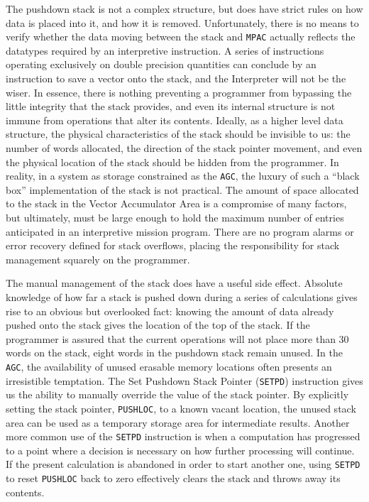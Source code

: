 \documentclass[refcap, oxford]{ahsan}
\begin{document}
The pushdown stack is not a complex structure, but does have strict rules on how data is placed into it, and how it is removed. Unfortunately, there is no means to verify whether the data moving between the stack and \texttt{MPAC} actually reflects the datatypes required by an interpretive instruction. A series of instructions operating exclusively on double precision quantities can conclude by an instruction to save a vector onto the stack, and the Interpreter will not be the wiser. In essence, there is nothing preventing a programmer from bypassing the little integrity that the stack provides, and even its internal structure is not immune from operations that alter its contents. Ideally, as a higher level data structure, the physical characteristics of the stack should be invisible to us: the number of words allocated, the direction of the stack pointer movement, and even the physical location of the stack should be hidden from the programmer. In reality, in a system as storage constrained as the \texttt{AGC}, the luxury of such a ``black box'' implementation of the stack is not practical. The amount of space allocated to the stack in the Vector Accumulator Area is a compromise of many factors, but ultimately, must be large enough to hold the maximum number of entries anticipated in an interpretive mission program. There are no program alarms or error recovery defined for stack overflows, placing the responsibility for stack management squarely on the programmer.

The manual management of the stack does have a useful side effect. Absolute knowledge of how far a stack is pushed down during a series of calculations gives rise to an obvious but overlooked fact: knowing the amount of data already pushed onto the stack gives the location of the top of the stack. If the programmer is assured that the current operations will not place more than 30 words on the stack, eight words in the pushdown stack remain unused. In the \texttt{AGC}, the availability of unused erasable memory locations often presents an irresistible temptation. The Set Pushdown Stack Pointer (\texttt{SETPD}) instruction gives us the ability to manually override the value of the stack pointer. By explicitly setting the stack pointer, \texttt{PUSHLOC}, to a known vacant location, the unused stack area can be used as a temporary storage area for intermediate results. Another more common use of the \texttt{SETPD} instruction is when a computation has progressed to a point where a decision is necessary on how further processing will continue. If the present calculation is abandoned in order to start another one, using \texttt{SETPD} to reset \texttt{PUSHLOC} back to zero effectively clears the stack and throws away its contents.
\end{document}
